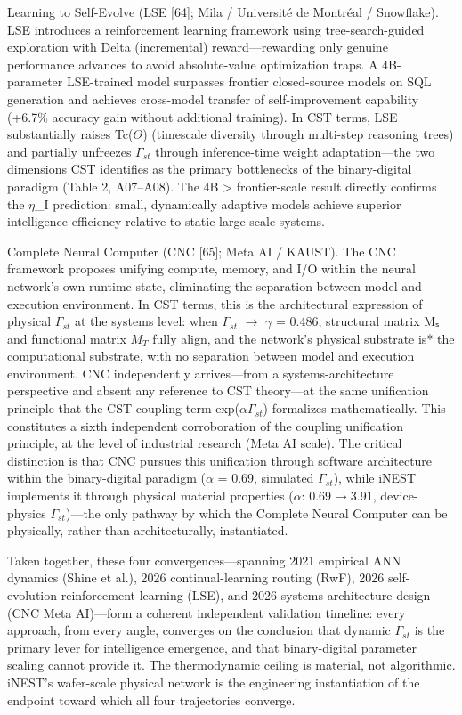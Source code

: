 \documentclass[a4paper,12pt]{article}
\begin{document}
Learning to Self-Evolve (LSE [64]; Mila / Université de Montréal / Snowflake). LSE introduces a reinforcement learning framework using tree-search-guided exploration with Delta (incremental) reward---rewarding only genuine performance advances to avoid absolute-value optimization traps. A 4B-parameter LSE-trained model surpasses frontier closed-source models on SQL generation and achieves cross-model transfer of self-improvement capability (+6.7\% accuracy gain without additional training). In CST terms, LSE substantially raises Tc($\Theta$) (timescale diversity through multi-step reasoning trees) and partially unfreezes $\Gamma_{st}$ through inference-time weight adaptation---the two dimensions CST identifies as the primary bottlenecks of the binary-digital paradigm (Table 2, A07--A08). The 4B > frontier-scale result directly confirms the $\eta$_I prediction: small, dynamically adaptive models achieve superior intelligence efficiency relative to static large-scale systems.


Complete Neural Computer (CNC [65]; Meta AI / KAUST). The CNC framework proposes unifying compute, memory, and I/O within the neural network's own runtime state, eliminating the separation between model and execution environment. In CST terms, this is the architectural expression of physical $\Gamma_{st}$ at the systems level: when $\Gamma_{st}$ $\rightarrow$ $\gamma$ = 0.486, structural matrix Mₛ and functional matrix $M_{T}$ fully align, and the network's physical substrate is* the computational substrate, with no separation between model and execution environment. CNC independently arrives---from a systems-architecture perspective and absent any reference to CST theory---at the same unification principle that the CST coupling term exp($\alpha$\cdot$\Gamma_{st}$) formalizes mathematically. This constitutes a sixth independent corroboration of the coupling unification principle, at the level of industrial research (Meta AI scale). The critical distinction is that CNC pursues this unification through software architecture within the binary-digital paradigm ($\alpha$ = 0.69, simulated $\Gamma_{st}$), while iNEST implements it through physical material properties ($\alpha$: 0.69$\rightarrow$3.91, device-physics $\Gamma_{st}$)---the only pathway by which the Complete Neural Computer can be physically, rather than architecturally, instantiated.


Taken together, these four convergences---spanning 2021 empirical ANN dynamics (Shine et al.), 2026 continual-learning routing (RwF), 2026 self-evolution reinforcement learning (LSE), and 2026 systems-architecture design (CNC Meta AI)---form a coherent independent validation timeline: every approach, from every angle, converges on the conclusion that dynamic $\Gamma_{st}$ is the primary lever for intelligence emergence, and that binary-digital parameter scaling cannot provide it. The thermodynamic ceiling is material, not algorithmic. iNEST's wafer-scale physical network is the engineering instantiation of the endpoint toward which all four trajectories converge.
\end{document}
